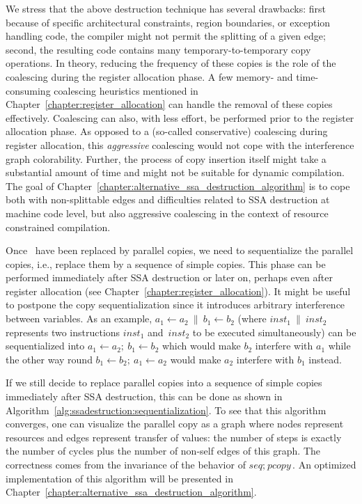 {We stress that the above destruction technique has several drawbacks: 
first because of specific architectural constraints, region boundaries, or exception handling code, the compiler might not permit the splitting of a given edge; 
second, the resulting code contains many temporary-to-temporary copy operations. 
In theory, reducing the frequency of these copies is the role of the coalescing during the register allocation phase. 
A few memory- and time-consuming coalescing heuristics mentioned in Chapter~\ref{chapter:register_allocation} can handle the removal of these copies effectively. 
Coalescing can also, with less effort, be performed prior to the register allocation phase. 
As opposed to a (so-called conservative) coalescing during register allocation, this \emph{aggressive} coalescing would not cope with the interference graph colorability. 
Further, the process of copy insertion itself might take a substantial amount of time and might not be suitable for dynamic compilation. 
The goal of Chapter~\ref{chapter:alternative_ssa_destruction_algorithm} is to cope both with non-splittable edges and difficulties related to SSA destruction at machine code level, but also aggressive coalescing in the context of resource constrained compilation.

Once \phifuns\ have been replaced by parallel copies, we need to sequentialize the parallel copies, i.e., replace them by a sequence of simple copies. 
This phase can be performed immediately after SSA destruction or later on, perhaps even after register allocation (see Chapter~\ref{chapter:register_allocation}). 
It might be useful to postpone the copy sequentialization since it introduces arbitrary interference between variables. 
As an example, $a_1\gets a_2\ \parallel\ b_1\gets b_2$ (where $\textit{inst}_1\ \parallel\ \textit{inst}_2$ represents two instructions $\textit{inst}_1$ and~$\textit{inst}_2$ to be executed simultaneously) can be sequentialized into $a_1\gets a_2;\ b_1\gets b_2$ which would make $b_2$ interfere with $a_1$ while the other way round $b_1\gets b_2;\ a_1\gets a_2$ would make $a_2$ interfere with $b_1$ instead.

If we still decide to replace parallel copies into a sequence of simple copies immediately after SSA destruction, this can be done as shown in Algorithm~\ref{alg:ssadestruction:sequentialization}. To see that this algorithm converges, one can visualize the parallel copy as a graph where nodes represent resources and edges represent transfer of values: 
the number of steps is exactly the number of cycles plus the number of non-self edges of this graph. 
The correctness comes from the invariance of the behavior of $\textit{seq};\ \textit{pcopy}$. 
An optimized implementation of this algorithm will be presented in Chapter~\ref{chapter:alternative_ssa_destruction_algorithm}.

}
